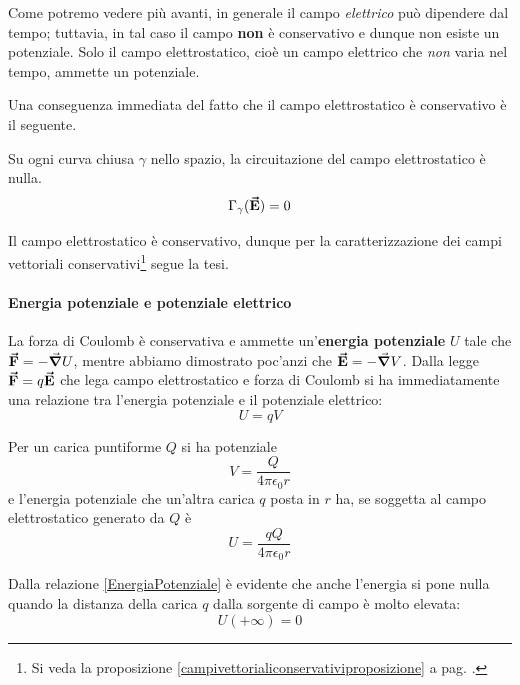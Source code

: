 \begin{attention}
	Come potremo vedere più avanti, in generale il campo \textit{elettrico} può dipendere dal tempo; tuttavia, in tal caso il campo \textbf{non} è conservativo e dunque non esiste un potenziale. Solo il campo elettrostatico, cioè un campo elettrico che \textit{non} varia nel tempo, ammette un potenziale.
\end{attention}
Una conseguenza immediata del fatto che il campo elettrostatico è conservativo è il seguente.
\begin{corollary}
	Su ogni curva chiusa $\gamma$ nello spazio, la circuitazione del campo elettrostatico è nulla.
	\begin{equation}
		\Gamma_{\gamma}(\vb*{\va{E}})=0
	\end{equation}
\end{corollary}
\begin{demonstration}
	Il campo elettrostatico è conservativo, dunque per la caratterizzazione dei campi vettoriali conservativi\footnote{Si veda la proposizione \ref{campivettorialiconservativiproposizione} a pag. \pageref{campivettorialiconservativiproposizione}.} segue la tesi. 
\end{demonstration}
\paragraph{Energia potenziale e potenziale elettrico}
La forza di Coulomb è conservativa e ammette un'\textbf{energia potenziale} $U$ tale che $\vb*{\va{F}}=-\grad{U}$, mentre abbiamo dimostrato poc'anzi che $\vb*{\va{E}}=-\grad{V}$. Dalla legge $\vb*{\va{F}}=q\vb*{\va{E}}$ che lega campo elettrostatico e forza di Coulomb si ha immediatamente una relazione tra l'energia potenziale e il potenziale elettrico:
\begin{equation}
	U=qV\label{EnergiaPotenziale}
\end{equation}
\begin{example}
	Per un carica puntiforme $Q$ si ha potenziale
	\begin{equation}
		V=\frac{Q}{4\pi\epsilon_0r}
	\end{equation}
	e l'energia potenziale che un'altra carica $q$ posta in $r$ ha, se soggetta al campo elettrostatico generato da $Q$ è
	\begin{equation}
		U=\frac{qQ}{4\pi\epsilon_0r}
	\end{equation}
\end{example}
Dalla relazione \eqref{EnergiaPotenziale} è evidente che anche l'energia si pone nulla quando la distanza della carica $q$ dalla sorgente di campo è molto elevata:
\begin{equation*}
	U(+\infty)=0
\end{equation*}
